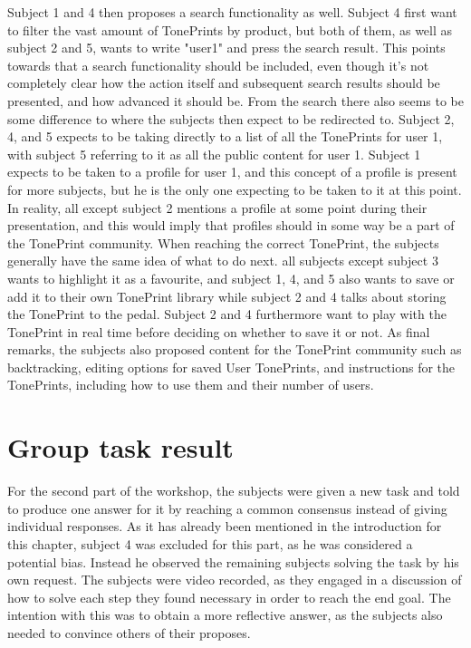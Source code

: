 Subject 1 and 4 then proposes a search functionality as well. Subject 4 first want to filter the vast amount of TonePrints by product, but both of them, as well as subject 2 and 5, wants to write "user1" and press the search result. This points towards that a search functionality should be included, even though it's not completely clear how the action itself and subsequent search results should be presented, and how advanced it should be. From the search there also seems to be some difference to where the subjects then expect to be redirected to. Subject 2, 4, and 5 expects to be taking directly to a list of all the TonePrints for user 1, with subject 5 referring to it as all the public content for user 1. Subject 1 expects to be taken to a profile for user 1, and this concept of a profile is present for more subjects, but he is the only one expecting to be taken to it at this point. In reality, all except subject 2 mentions a profile at some point during their presentation, and this would imply that profiles should in some way be a part of the TonePrint community. When reaching the correct TonePrint, the subjects generally have the same idea of what to do next. all subjects except subject 3 wants to highlight it as a favourite, and subject 1, 4, and 5 also wants to save or add it to their own TonePrint library while subject 2 and 4 talks about storing the TonePrint to the pedal. Subject 2 and 4 furthermore want to play with the TonePrint in real time before deciding on whether to save it or not. As final remarks, the subjects also proposed content for the TonePrint community such as backtracking, editing options for saved User TonePrints, and instructions for the TonePrints, including how to use them and their number of users.

\section{Group task result}
\label{GroupTaskResults}
For the second part of the workshop, the subjects were given a new task and told to produce one answer for it by reaching a common consensus instead of giving individual responses. As it has already been mentioned in the introduction for this chapter, subject 4 was excluded for this part, as he was considered a potential bias. Instead he observed the remaining subjects solving the task by his own request. The subjects were video recorded, as they engaged in a discussion of how to solve each step they found necessary in order to reach the end goal. The intention with this was to obtain a more reflective answer, as the subjects also needed to convince others of their proposes. \\


